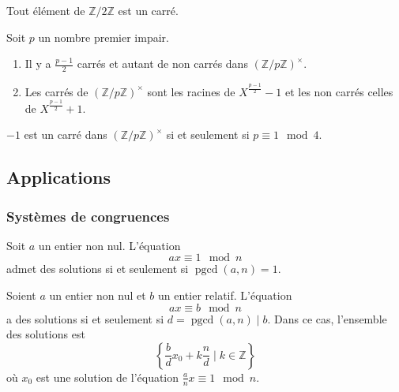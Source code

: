 
  \begin{remark}
    Tout élément de $\mathbb{Z}/2\mathbb{Z}$ est un carré.
  \end{remark}

  Soit $p$ un nombre premier impair.

  \begin{theorem}
    \begin{enumerate}[label=(\roman*)]
      \item Il y a $\frac{p-1}{2}$ carrés et autant de non carrés dans $(\mathbb{Z}/p\mathbb{Z})^\times$.
      \item Les carrés de $(\mathbb{Z}/p\mathbb{Z})^\times$ sont les racines de $X^{\frac{p-1}{2}} - 1$ et les non carrés celles de $X^{\frac{p-1}{2}} + 1$.
    \end{enumerate}
  \end{theorem}

  \begin{corollary}
    $-1$ est un carré dans $(\mathbb{Z}/p\mathbb{Z})^\times$ si et seulement si $p \equiv 1 \mod 4$.
  \end{corollary}

  \subsection{Applications}

  \subsubsection{Systèmes de congruences}


  \begin{proposition}
    Soit $a$ un entier non nul. L'équation
    \[ ax \equiv 1 \mod n \]
    admet des solutions si et seulement si $\operatorname{pgcd}(a,n) = 1$.
  \end{proposition}

  \begin{corollary}
    Soient $a$ un entier non nul et $b$ un entier relatif. L'équation
    \[ ax \equiv b \mod n \]
    a des solutions si et seulement si $d = \operatorname{pgcd}(a,n) \mid b$. Dans ce cas, l'ensemble des solutions est
    \[ \left\{ \frac{b}{d}x_0 + k\frac{n}{d} \mid k \in \mathbb{Z} \right\} \]
    où $x_0$ est une solution de l'équation $\frac{a}{n}x \equiv 1 \mod n$.
  \end{corollary}

